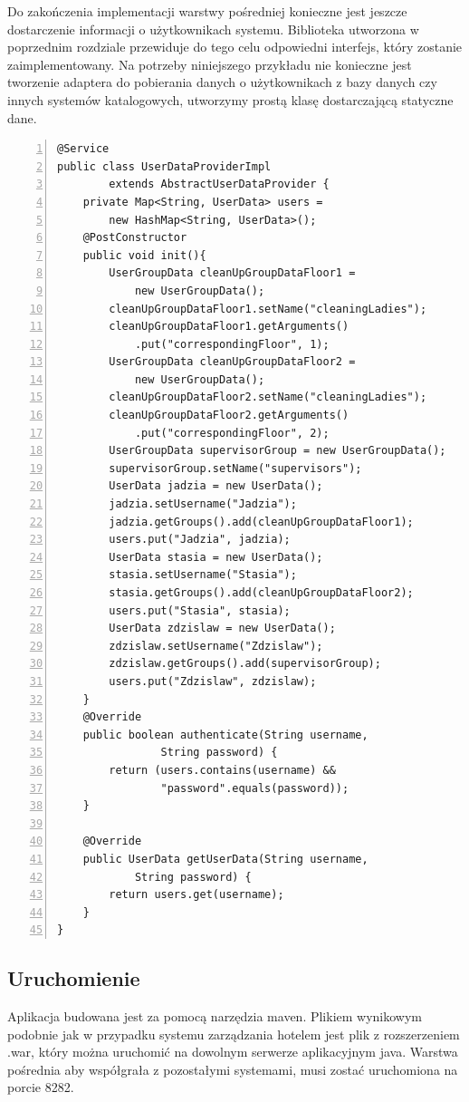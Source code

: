 Do zakończenia implementacji warstwy pośredniej konieczne jest jeszcze dostarczenie informacji o użytkownikach systemu. Biblioteka utworzona w poprzednim rozdziale przewiduje do tego celu odpowiedni interfejs, który zostanie zaimplementowany. Na potrzeby niniejszego przykładu nie konieczne jest tworzenie adaptera do pobierania danych o użytkownikach z bazy danych czy innych systemów katalogowych, utworzymy prostą klasę dostarczającą statyczne dane. 

\begin{lstlisting}[caption=Dostawca informacji o użytkownikach. =,numbers=left]
@Service
public class UserDataProviderImpl 
		extends AbstractUserDataProvider {
	private Map<String, UserData> users = 
		new HashMap<String, UserData>();
	@PostConstructor
	public void init(){
		UserGroupData cleanUpGroupDataFloor1 = 
			new UserGroupData();
		cleanUpGroupDataFloor1.setName("cleaningLadies");
		cleanUpGroupDataFloor1.getArguments()
			.put("correspondingFloor", 1);
		UserGroupData cleanUpGroupDataFloor2 = 
			new UserGroupData();
		cleanUpGroupDataFloor2.setName("cleaningLadies");
		cleanUpGroupDataFloor2.getArguments()
			.put("correspondingFloor", 2);
		UserGroupData supervisorGroup = new UserGroupData();
		supervisorGroup.setName("supervisors");
		UserData jadzia = new UserData();
		jadzia.setUsername("Jadzia");
		jadzia.getGroups().add(cleanUpGroupDataFloor1);
		users.put("Jadzia", jadzia);
		UserData stasia = new UserData();
		stasia.setUsername("Stasia");
		stasia.getGroups().add(cleanUpGroupDataFloor2);
		users.put("Stasia", stasia);
		UserData zdzislaw = new UserData();
		zdzislaw.setUsername("Zdzislaw");
		zdzislaw.getGroups().add(supervisorGroup);
		users.put("Zdzislaw", zdzislaw);
	}
	@Override
	public boolean authenticate(String username, 
				String password) {
		return (users.contains(username) && 
				"password".equals(password));
	}

	@Override
	public UserData getUserData(String username, 
			String password) {
		return users.get(username);
	}
}
\end{lstlisting}

\subsection{Uruchomienie}

Aplikacja budowana jest za pomocą narzędzia maven. Plikiem wynikowym podobnie jak w przypadku systemu zarządzania hotelem jest plik z rozszerzeniem .war, który można uruchomić na dowolnym serwerze aplikacyjnym java. Warstwa pośrednia aby współgrała z pozostałymi systemami, musi zostać uruchomiona na porcie 8282. 

